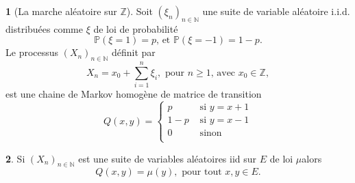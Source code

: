 \documentclass[8pt,notheorems]{beamer}
\def \N{\mathbb N}
\theoremstyle{definition}
\theoremstyle{example}
\newtheorem{example}{\translate{Exemple}}
\theoremstyle{mystyle}
\theoremstyle{plain}
\begin{document}
\begin{frame}[allowframebreaks]
\begin{example}[La marche aléatoire sur $\mathbb{Z}$]
Soit $(\xi_n)_{n\in\mathbb{N}}$ une suite de variable aléatoire i.i.d. distribuées comme $\xi$ de loi de probabilité
$$
\mathbb{P}(\xi=1)=p\text{, et } \mathbb{P}(\xi=-1)=1-p.
$$
Le processus $(X_n)_{n\in\mathbb{N}}$ définit par
$$
X_n= x_0 + \sum_{i=1}^{n}\xi_i, \text{ pour $n\geq1$, avec }x_0\in\mathbb{Z},
$$
est une chaine de Markov homogène de matrice de transition
$$
Q(x,y)=
\begin{cases}
p&\text{ si }y=x+1\\
1-p&\text{ si }y=x-1\\
0&\text{ sinon }\\
\end{cases}
$$
\end{example}
\begin{example}
Si $(X_n)_{n\in \N}$ est une suite de variables aléatoires iid sur $E$ de loi $\mu$alors
$$
Q(x,y) = \mu(y),\text{ pour tout }x,y\in E.
$$
\end{example}
 \end{frame}
\end{document}
